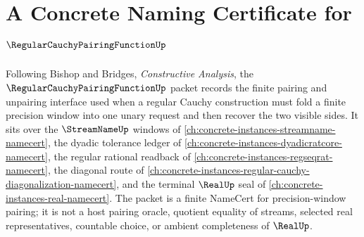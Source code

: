 \chapter{A Concrete Naming Certificate for $\RegularCauchyPairingFunctionUp$}
\label{ch:concrete-instances-regular-cauchy-pairing-function-namecert}

Following Bishop and Bridges, \emph{Constructive Analysis}, the $\RegularCauchyPairingFunctionUp$ packet records the finite pairing and unpairing interface used when a regular Cauchy construction must fold a finite precision window into one unary request and then recover the two visible sides. It sits over the $\StreamNameUp$ windows of \autoref{ch:concrete-instances-streamname-namecert}, the dyadic tolerance ledger of \autoref{ch:concrete-instances-dyadicratcore-namecert}, the regular rational readback of \autoref{ch:concrete-instances-regseqrat-namecert}, the diagonal route of \autoref{ch:concrete-instances-regular-cauchy-diagonalization-namecert}, and the terminal $\RealUp$ seal of \autoref{ch:concrete-instances-real-namecert}. The packet is a finite NameCert for precision-window pairing; it is not a host pairing oracle, quotient equality of streams, selected real representatives, countable choice, or ambient completeness of $\RealUp$.


